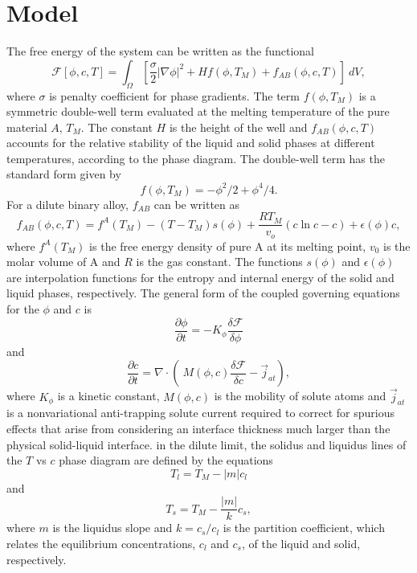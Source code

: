 \documentclass[10pt]{article}
\begin{document}
\section{Model}
The free energy of the system can be written as the functional~\cite{Echebarria2004}
\begin{equation}
\mathcal{F}[\phi,c,T]= \int_{\Omega}  \left[\frac{\sigma}{2}|\nabla \phi|^2 +Hf(\phi, T_M) +  f_{AB}(\phi, c, T) \right]  ~dV,
\end{equation}
where $\sigma$ is penalty coefficient for phase gradients. The term $f(\phi, T_M)$ is a symmetric double-well term evaluated at the melting temperature of the pure material $A$,  $T_M$. The constant $H$ is the height of the well and $f_{AB}(\phi, c, T)$ accounts for the relative stability of the liquid and solid phases at different temperatures, according to the phase diagram. The double-well term has the standard form given by
\begin{equation}
f(\phi, T_M) = -\phi^2/2 + \phi^4/4.
\end{equation}
For a dilute binary alloy, $f_{AB}$ can be written as
\begin{equation}
f_{AB}(\phi, c, T) = f^A(T_M) - (T-T_M) s(\phi) +  \frac{R T_M}{v_o}(c\ln c -c) +\epsilon (\phi) c,
\end{equation}
where $f^A(T_M)$ is the free energy density of pure A at its melting point, $v_0$ is the molar volume of A and $R$ is the gas constant. The functions $s(\phi)$ and $\epsilon (\phi)$ are interpolation functions for the entropy and internal energy of the solid and liquid phases, respectively. The general form of the coupled governing equations for the $\phi$ and $c$ is
\begin{equation}
\frac{\partial \phi}{\partial t} = -K_\phi \frac{\delta \mathcal{F}}{\delta \phi}
\end{equation}
and
\begin{equation}
\frac{\partial c}{\partial t} = \nabla \cdot \left(\  M(\phi,c) \frac{\delta \mathcal{F}}{\delta c}  - \vec{j}_{at} \right), 
\end{equation}
where $K_\phi$ is a kinetic constant, $M(\phi,c)$ is the mobility of solute atoms and $\vec{j}_{at}$ is a nonvariational anti-trapping solute current required to correct for spurious effects that arise from considering an interface thickness much larger than the physical solid-liquid interface. in the dilute limit, the solidus and liquidus lines of the $T$ vs $c$ phase diagram are defined by the equations
\begin{equation}
T_l=T_M-|m|c_l
\end{equation}
and
\begin{equation}
T_s=T_M-\frac{|m|}{k}c_s,
\end{equation}
where $m$ is the liquidus slope and $k=c_s/c_l$ is the partition coefficient, which relates the equilibrium concentrations, $c_l$ and $c_s$, of the liquid and solid, respectively.\\
\end{document}
